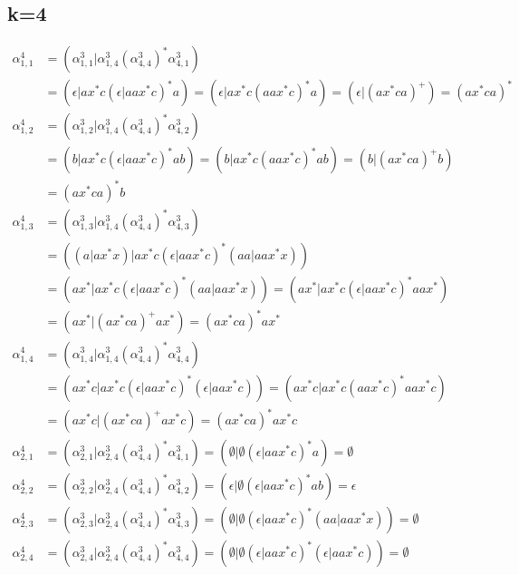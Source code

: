 \documentclass{article}
\begin{document}
\subsection*{k=4}
\begin{align*}
\alpha^4_{1,1} &= \left(\alpha^3_{1,1}|\alpha^3_{1,4}\left(\alpha^3_{4,4}\right)^*\alpha^3_{4,1}\right) \\&= \left(\epsilon|ax^*c\left(\epsilon|aax^*c\right)^*a\right) = \left(\epsilon|ax^*c\left(aax^*c\right)^*a\right) = \left(\epsilon|\left(ax^*ca\right)^+\right) = \left(ax^*ca\right)^*\\
\alpha^4_{1,2} &= \left(\alpha^3_{1,2}|\alpha^3_{1,4}\left(\alpha^3_{4,4}\right)^*\alpha^3_{4,2}\right) \\&= \left(b|ax^*c\left(\epsilon|aax^*c\right)^*ab\right) = \left(b|ax^*c\left(aax^*c\right)^*ab\right) = \left(b|\left(ax^*ca\right)^+b\right) \\&= \left(ax^*ca\right)^*b \\
\alpha^4_{1,3} &= \left(\alpha^3_{1,3}|\alpha^3_{1,4}\left(\alpha^3_{4,4}\right)^*\alpha^3_{4,3}\right) \\&= \left(\left(a|ax^*x\right)|ax^*c\left(\epsilon|aax^*c\right)^*\left(aa|aax^*x\right)\right) \\&= \left(ax^*|ax^*c\left(\epsilon|aax^*c\right)^*\left(aa|aax^*x\right)\right) = \left(ax^*|ax^*c\left(\epsilon|aax^*c\right)^*aax^*\right) \\&= \left(ax^*|(ax^*ca)^+ax^*\right) = (ax^*ca)^*ax^*\\
\alpha^4_{1,4} &= \left(\alpha^3_{1,4}|\alpha^3_{1,4}\left(\alpha^3_{4,4}\right)^*\alpha^3_{4,4}\right) \\&= \left(ax^*c|ax^*c\left(\epsilon|aax^*c\right)^*\left(\epsilon|aax^*c\right)\right) = \left(ax^*c|ax^*c\left(aax^*c\right)^*aax^*c\right) \\&= \left(ax^*c|\left(ax^*ca\right)^+ax^*c\right) = \left(ax^*ca\right)^*ax^*c \\
\alpha^4_{2,1} &= \left(\alpha^3_{2,1}|\alpha^3_{2,4}\left(\alpha^3_{4,4}\right)^*\alpha^3_{4,1}\right) = \left(\emptyset|\emptyset\left(\epsilon|aax^*c\right)^*a\right) = \emptyset \\
\alpha^4_{2,2} &= \left(\alpha^3_{2,2}|\alpha^3_{2,4}\left(\alpha^3_{4,4}\right)^*\alpha^3_{4,2}\right) = \left(\epsilon|\emptyset\left(\epsilon|aax^*c\right)^*ab\right) = \epsilon \\
\alpha^4_{2,3} &= \left(\alpha^3_{2,3}|\alpha^3_{2,4}\left(\alpha^3_{4,4}\right)^*\alpha^3_{4,3}\right) = \left(\emptyset|\emptyset\left(\epsilon|aax^*c\right)^*\left(aa|aax^*x\right)\right) = \emptyset \\
\alpha^4_{2,4} &= \left(\alpha^3_{2,4}|\alpha^3_{2,4}\left(\alpha^3_{4,4}\right)^*\alpha^3_{4,4}\right) = \left(\emptyset|\emptyset\left(\epsilon|aax^*c\right)^*\left(\epsilon|aax^*c\right)\right) = \emptyset
\end{align*}
\end{document}
